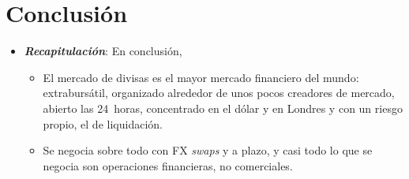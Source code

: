 \documentclass[11pt]{article}
\begin{document}
\section*{Conclusión}

\begin{itemize}
\item \textbf{\emph{Recapitulación}}: En conclusión,
  \begin{itemize}
  \item El mercado de divisas es el mayor mercado financiero del mundo: extrabursátil, organizado alrededor de unos pocos creadores de mercado, abierto las 24~horas, concentrado en el dólar y en Londres y con un riesgo propio, el de liquidación.

  \item Se negocia sobre todo con FX \emph{swaps} y a plazo, y casi todo lo que se negocia son operaciones financieras, no comerciales.


\end{itemize}
\end{itemize}
\end{document}
